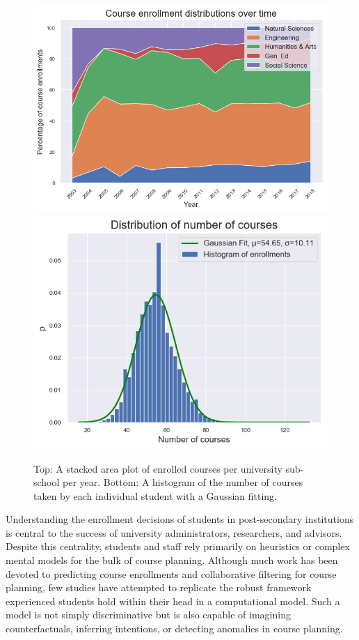 \documentclass{edm_template}
\begin{document}
\begin{figure}
    \centering
    \includegraphics[scale=0.45]{figures/dists_over_time.png}
    \includegraphics[scale=0.55]{figures/enrollment_dist.png}
    \caption{Top: A stacked area plot of enrolled courses per university sub-school per year. Bottom: A histogram of the number of courses taken by each individual student with a Gaussian fitting.}
    \label{fig:data_statistics}
\end{figure}

Understanding the enrollment decisions of students in post-secondary institutions is central to the success of university administrators, researchers, and advisors. Despite this centrality, students and staff rely primarily on heuristics or complex mental models for the bulk of course planning. Although much work has been devoted to predicting course enrollments and collaborative filtering for course planning, few studies have attempted to replicate the robust framework experienced students hold within their head in a computational model. Such a model is not simply discriminative but is also capable of imagining counterfactuals, inferring intentions, or detecting anomalies in course planning.
\end{document}
